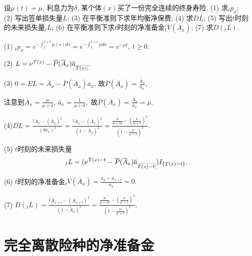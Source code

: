 \documentclass[lang=cn,10pt]{elegantbook}
\makeatletter
\DeclareRobustCommand{\annu}[1]{_{%
    \def\arraystretch{0}%
    \setlength\arraycolsep{1pt}%
    \setlength\arrayrulewidth{.2pt}%
    \begin{array}[b]{@{}c|}\hline
        \\[\arraycolsep]%
        \scriptstyle #1%
    \end{array}%
}}
\makeatother
\begin{document}
\begin{example}\label{l5.1}
    设$\mu(t)=\mu$, 利息力为$\delta$, 某个体$(x)$买了一份完全连续的终身寿险.
    (1) 求${}_tp_x$; (2) 写出签单损失量$L$;  (3) 在平衡准则下求年均衡净保费; (4) 求$DL$;
    (5) 写出$t$时刻的未来损失量${}_tL$;
    (6) 在平衡准则下求$t$时刻的净准备金$_tV(\overline A_x)$;
    (7) 求$D({}_tL).$

\end{example}
\begin{solution}
(1) $_tp_x=e^{-\int_x^{x+t}\mu(s)ds}=e^{-\int_x^{x+t}\mu ds}=e^{-\mu t},\ t\ge 0.$

(2) $L=\nu^{T(x)}-\overline P(\overline A_x)\overline a_{\annu {T(x)}}.$

(3) $0=EL=\overline A_x-\overline P(\overline A_x)\overline a_x$, 故$\overline P(\overline A_x)=\frac{\overline A_x}{\overline a_x},$

注意到$\overline A_x=\frac{\mu}{\mu+\delta}$, $\overline a_x=\frac{1}{\mu+\delta},$
故$\overline P(\overline A_x)=\frac{\overline A_x}{\overline a_x}=\mu.$

(4)$DL=\frac{^2\overline A_{x}-(\overline A_{x})^2}{(\delta\overline a_x)^2}=\frac{^2\overline A_{x}-(\overline A_{x})^2}{(1-\overline A_x)^2}=\frac{\frac{\mu}{\mu+2\delta}-(\frac{\mu}{\mu+\delta})^2}{(1-\frac{\mu}{\mu+\delta})^2}.$

(5) $t$时刻的未来损失量
$${}_tL= (\nu^{T(x)-t}-\overline{P}( \overline{A}_x )\overline a_{\annu {T(x)-t}} )I_{\{T(x)>t\}}.$$

(6) $t$时刻的净准备金$ {}_tV(\overline A_x)=\frac{\overline a_{x}-\overline a_{x+t}}{\overline a_x}=0.$

(7) $D({}_tL)=\frac{^2\overline A_{x+t}-(\overline A_{x+t})^2}{(1-\overline A_x)^2}=\frac{\frac{\mu}{\mu+2\delta}-(\frac{\mu}{\mu+\delta})^2}{(1-\frac{\mu}{\mu+\delta})^2}.$ 
\end{solution}

\section{完全离散险种的净准备金}
\end{document}
